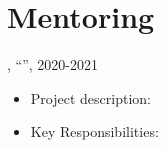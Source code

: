 

\section*{Mentoring}
, ``'', \emph{}\hfill 2020-2021
\begin{itemize}
	\item Project description: 
	\item Key Responsibilities: 
\end{itemize}

